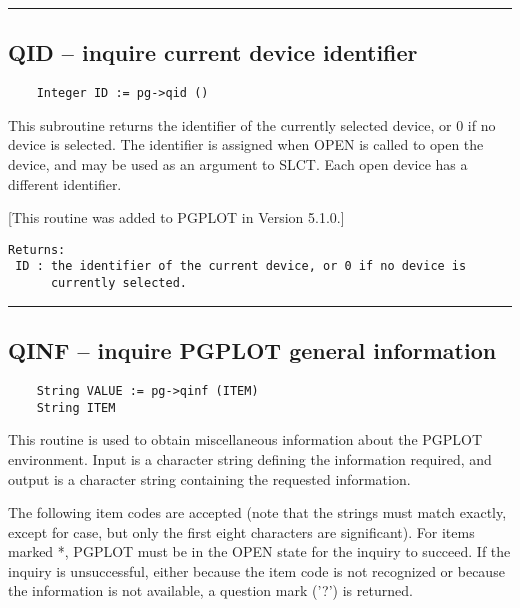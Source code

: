 \hrule

\subsection*{QID -- inquire current device identifier }

\begin{verbatim}
    Integer ID := pg->qid ()
\end{verbatim}

This subroutine returns the identifier of the currently selected
device, or 0 if no device is selected.  The identifier is assigned
when OPEN is called to open the device, and may be used as an argument
to SLCT.  Each open device has a different identifier.

[This routine was added to PGPLOT in Version 5.1.0.]

\begin{verbatim}
Returns:
 ID : the identifier of the current device, or 0 if no device is
      currently selected. 
\end{verbatim}

\hrule

\subsection*{QINF -- inquire PGPLOT general information }

\begin{verbatim}
    String VALUE := pg->qinf (ITEM)
    String ITEM
\end{verbatim}

This routine is used to obtain miscellaneous information about the
PGPLOT environment.  Input is a character string defining the
information required, and output is a character string containing the
requested information.

The following item codes are accepted (note that the strings must
match exactly, except for case, but only the first eight characters are
significant).  For items marked *, PGPLOT must be in the OPEN state
for the inquiry to succeed.  If the inquiry is unsuccessful, either
because the item code is not recognized or because the information is
not available, a question mark ('?') is returned.

